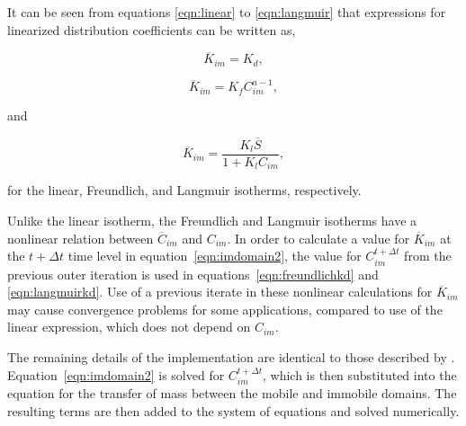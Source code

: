 It can be seen from equations \ref{eqn:linear} to \ref{eqn:langmuir} that expressions for linearized distribution coefficients can be written as,

\begin{equation}
\label{eqn:linearkd}
\overline{K}_{im} = K_d,
\end{equation}

\begin{equation}
\label{eqn:freundlichkd}
\overline{K}_{im} = K_f C_{im}^{a - 1},
\end{equation}

\noindent and

\begin{equation}
\label{eqn:langmuirkd}
\overline{K}_{im} = \frac{K_l \overline{S}}{1 + K_l C_{im}},
\end{equation}

\noindent for the linear, Freundlich, and Langmuir isotherms, respectively.

Unlike the linear isotherm, the Freundlich and Langmuir isotherms have a nonlinear relation between $\overline{C}_{im}$ and $C_{im}$.  In order to calculate a value for $\overline{K}_{im}$ at the $t + \Delta t$ time level in equation~\ref{eqn:imdomain2}, the value for $C_{im}^{t + \Delta t}$ from the previous outer iteration is used in equations~\ref{eqn:freundlichkd} and \ref{eqn:langmuirkd}.  Use of a previous iterate in these nonlinear calculations for $\overline{K}_{im}$ may cause convergence problems for some applications, compared to use of the linear expression, which does not depend on $C_{im}$.

The remaining details of the implementation are identical to those described by \cite{modflow6gwt}.  Equation~\ref{eqn:imdomain2} is solved for $C_{im}^{t + \Delta t}$, which is then substituted into the equation for the transfer of mass between the mobile and immobile domains.  The resulting terms are then added to the system of equations and solved numerically.